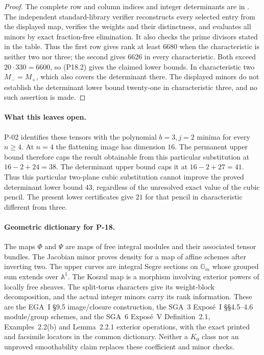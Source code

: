 \begin{proof}
The complete row and column indices and integer
determinants are in
.
The independent standard-library verifier
 reconstructs
every selected entry from the displayed map, verifies
the weights and their distinctness, and evaluates all
minors by exact fraction-free elimination. It also
checks the prime divisors stated in the table. Thus
the first row gives rank at least $6680$ when the
characteristic is neither two nor three; the second
gives $6626$ in every characteristic. Both exceed
$20\cdot330=6600$, so (P18.2) gives the claimed lower
bounds. In characteristic two $M_-=M_+$, which also
covers the determinant there. The displayed minors
do not establish the determinant lower bound twenty-one
in characteristic three, and no such assertion is made.
\end{proof}

\paragraph{What this leaves open.}
P-02 identifies these tensors with the polynomial
$b=3,j=2$ minima for every $n\geq4$. At $n=4$ the
flattening image has dimension $16$. The permanent
upper bound therefore caps the result obtainable from
this particular substitution at $16-2+24=38$.
The determinant upper bound caps it at
$16-2+27=41$. Thus this particular two-plane cubic
substitution cannot improve the proved determinant
lower bound $43$, regardless of the unresolved exact
value of the cubic pencil. The present lower
certificates give $21$ for that pencil in characteristic
different from three.

\paragraph{Geometric dictionary for P-18.}
The maps $\Phi$ and $\Psi$ are maps of free integral
modules and their associated tensor bundles. The
Jacobian minor proves density for a map of affine
schemes after inverting two. The upper curves
are integral Segre sections on $\mathbb G_m$ whose
grouped sum extends over $\mathbb A^1$. The Koszul
map is a morphism involving exterior powers of locally
free sheaves. The split-torus characters give its
weight-block decomposition, and the actual integer
minors carry its rank information. These are the
EGA~I \S9.5 image/closure construction, the SGA~3
Expos\'e~I \S\S4.5--4.6 module/group schemes, and
the SGA~6 Expos\'e~V Definition~2.1, Examples~2.2(b)
and Lemma~2.2.1 exterior operations, with the exact
printed and facsimile locators in the common dictionary.
Neither a $K_0$ class nor an unproved smoothability
claim replaces these coefficient and minor checks.
